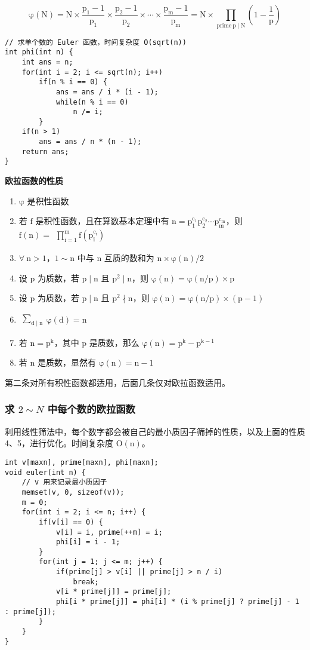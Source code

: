 \documentclass[UTF8]{article}
\begin{document}
$$
\mathrm{\varphi(N) = N \times \frac{p_1 - 1}{p_1} \times \frac{p_2 - 1}{p_2} \times \cdots \times \frac{p_m - 1}{p_m} = N \times \prod_{prime\ p \mid N} (1 - \frac{1}{p})}
$$
\begin{lstlisting}[caption=欧拉函数]
// 求单个数的 Euler 函数，时间复杂度 O(sqrt(n))
int phi(int n) {
	int ans = n;
	for(int i = 2; i <= sqrt(n); i++) 
		if(n % i == 0) {
			ans = ans / i * (i - 1);
			while(n % i == 0)
				n /= i;
		}
	if(n > 1)
		ans = ans / n * (n - 1);
	return ans;
}
\end{lstlisting}
\noindent \textbf{欧拉函数的性质}
\begin{enumerate}
	\item $\mathrm{\varphi}$ 是积性函数
	\item 若 $\mathrm{f}$ 是积性函数，且在算数基本定理中有 $\mathrm{n = p_1^{c_1}p_2^{c_2}\cdots p_m^{c_m}}$，则 $\mathrm{f(n) = \begin{matrix} \prod_{i=1}^m f(p_i^{c_i}) \end{matrix}}$
	\item $\mathrm{\forall \  n > 1}$，$\mathrm{1 \sim n}$ 中与 $\mathrm{n}$ 互质的数和为 $\mathrm{n \times \varphi(n) / 2}$
	\item 设 $\mathrm{p}$ 为质数，若 $\mathrm{p \mid n}$ 且 $\mathrm{p^2 \mid n}$，则 $\mathrm{\varphi(n) = \varphi(n / p) \times p}$
	\item 设 $\mathrm{p}$ 为质数，若 $\mathrm{p \mid n}$ 且 $\mathrm{p^2 \nmid n}$，则 $\mathrm{\varphi(n) = \varphi(n / p) \times (p - 1)}$
	\item $\mathrm{\begin{matrix} \sum_{d \mid n} \end{matrix} \varphi(d) = n}$
	\item 若 $\mathrm{n = p^k}$，其中 $\mathrm{p}$ 是质数，那么 $\mathrm{\varphi(n) = p^k - p^{k - 1}}$
	\item 若 $\mathrm{n}$ 是质数，显然有 $\mathrm{\varphi(n) = n - 1}$
\end{enumerate}

第二条对所有积性函数都适用，后面几条仅对欧拉函数适用。


\subsubsection{求 $2 \sim N$ 中每个数的欧拉函数}
利用线性筛法中，每个数字都会被自己的最小质因子筛掉的性质，以及上面的性质 4、5，进行优化。时间复杂度 $\mathrm{O(n)}$。
\begin{lstlisting}[caption=求 2 $\sim$ N 中每个数的欧拉函数]
int v[maxn], prime[maxn], phi[maxn];
void euler(int n) {
	// v 用来记录最小质因子
	memset(v, 0, sizeof(v));
	m = 0;
	for(int i = 2; i <= n; i++) {
		if(v[i] == 0) {
			v[i] = i, prime[++m] = i;
			phi[i] = i - 1;
		}
		for(int j = 1; j <= m; j++) {
			if(prime[j] > v[i] || prime[j] > n / i)
				break;
			v[i * prime[j]] = prime[j];
			phi[i * prime[j]] = phi[i] * (i % prime[j] ? prime[j] - 1 : prime[j]);
		}
	}
}
\end{lstlisting}
\end{document}
